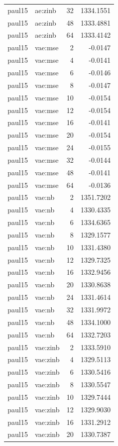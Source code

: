 \begin{tabular}{llrr}
paul15 & ae:zinb & 32 & 1334.1551 \\
paul15 & ae:zinb & 48 & 1333.4881 \\
paul15 & ae:zinb & 64 & 1333.4142 \\
paul15 & vae:mse & 2 & -0.0147 \\
paul15 & vae:mse & 4 & -0.0141 \\
paul15 & vae:mse & 6 & -0.0146 \\
paul15 & vae:mse & 8 & -0.0147 \\
paul15 & vae:mse & 10 & -0.0154 \\
paul15 & vae:mse & 12 & -0.0154 \\
paul15 & vae:mse & 16 & -0.0141 \\
paul15 & vae:mse & 20 & -0.0154 \\
paul15 & vae:mse & 24 & -0.0155 \\
paul15 & vae:mse & 32 & -0.0144 \\
paul15 & vae:mse & 48 & -0.0141 \\
paul15 & vae:mse & 64 & -0.0136 \\
paul15 & vae:nb & 2 & 1351.7202 \\
paul15 & vae:nb & 4 & 1330.4335 \\
paul15 & vae:nb & 6 & 1334.6365 \\
paul15 & vae:nb & 8 & 1329.1577 \\
paul15 & vae:nb & 10 & 1331.4380 \\
paul15 & vae:nb & 12 & 1329.7325 \\
paul15 & vae:nb & 16 & 1332.9456 \\
paul15 & vae:nb & 20 & 1330.8638 \\
paul15 & vae:nb & 24 & 1331.4614 \\
paul15 & vae:nb & 32 & 1331.9972 \\
paul15 & vae:nb & 48 & 1334.1000 \\
paul15 & vae:nb & 64 & 1332.7203 \\
paul15 & vae:zinb & 2 & 1333.5910 \\
paul15 & vae:zinb & 4 & 1329.5113 \\
paul15 & vae:zinb & 6 & 1330.5416 \\
paul15 & vae:zinb & 8 & 1330.5547 \\
paul15 & vae:zinb & 10 & 1329.7444 \\
paul15 & vae:zinb & 12 & 1329.9030 \\
paul15 & vae:zinb & 16 & 1331.2912 \\
paul15 & vae:zinb & 20 & 1330.7387 \\

\end{tabular}
